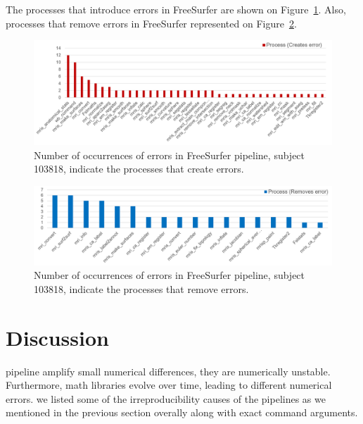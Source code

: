 \documentclass{article}
\begin{document}
The processes that introduce errors in FreeSurfer are shown on Figure~\ref{fig:fs_error_table}.
Also, processes that remove errors in FreeSurfer represented on Figure~\ref{fig:fs_remove_table}.
\begin{figure}[H]
\centering
  \includegraphics[scale=0.5]{images/fs_error_table.png}
  \caption{Number of occurrences of errors in FreeSurfer pipeline, subject 103818, 
indicate the processes that create errors.}
  \label{fig:fs_error_table}
\end{figure}

\begin{figure}[H]
\centering
  \includegraphics[scale=0.5]{images/fs_remove_table.png}
  \caption{Number of occurrences of errors in FreeSurfer pipeline, subject 103818, 
indicate the processes that remove errors.}
  \label{fig:fs_remove_table}
\end{figure}


\section{Discussion}

pipeline amplify small numerical differences, they are numerically unstable.
Furthermore, math libraries evolve over time, leading to different numerical errors.
we listed some of the irreproducibility causes of the pipelines as we mentioned
in the previous section overally along with exact command arguments.
\end{document}
